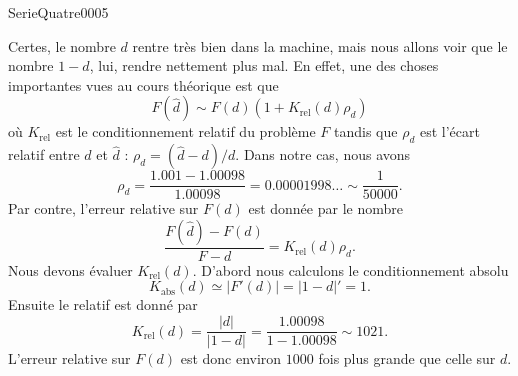 
\begin{corrige}{SerieQuatre0005}

	Certes, le nombre $d$ rentre très bien dans la machine, mais nous allons voir que le nombre $1-d$, lui, rendre nettement plus mal. En effet, une des choses importantes vues au cours théorique est que
	\begin{equation}
		F(\hat d)\sim F(d)(1+K_{\text{rel}}(d)\rho_d)
	\end{equation}
	où $K_{\text{rel}}$ est le conditionnement relatif du problème $F$ tandis que $\rho_d$ est l'écart relatif entre $d$ et $\hat d$ : $\rho_d=(\hat d-d)/d$. Dans notre cas, nous avons
	\begin{equation}
		\rho_d=\frac{ 1.001-1.00098 }{ 1.00098 }=0.00001998\ldots\sim\frac{1}{ 50000 }.
	\end{equation}
	Par contre, l'erreur relative sur $F(d)$ est donnée par le nombre
	\begin{equation}		\label{EqEcartRelSurF}
		\frac{ F(\hat d)-F(d) }{ F-d }=K_{\text{rel}}(d)\rho_d.
	\end{equation}
	Nous devons évaluer $K_{\text{rel}}(d)$. D'abord nous calculons le conditionnement absolu
	\begin{equation}
		K_{\text{abs}}(d)\simeq| F'(d) |=| 1-d |'=1.
	\end{equation}
	Ensuite le relatif est donné par
	\begin{equation}
		K_{\text{rel}}(d)=\frac{ | d | }{ | 1-d | }=\frac{ 1.00098 }{ 1-1.00098 }\sim 1021.
	\end{equation}
	L'erreur relative sur $F(d)$ est donc environ $1000$ fois plus grande que celle sur $d$.

\end{corrige}
